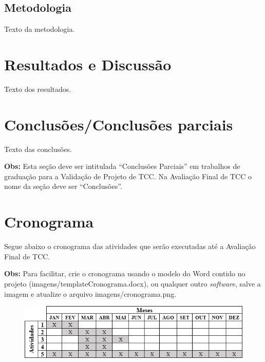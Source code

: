 \documentclass[
	article,			%
	11pt,				%
	oneside,			%
	a4paper,			%
	chapter=TITLE,		%
	section=TITLE,		%
	english,			%
	brazil,				%
	sumario=tradicional
]{abntex2}
\begin{document}
     
     
     
     \subsection{Metodologia}
     
     Texto da metodologia.
     
     
     
     
     

	\section{Resultados e Discussão}
    	
     Texto dos resultados.
     
     
     

	\section{Conclusões/Conclusões parciais}
	
	Texto das conclusões.
	
	\textbf{Obs:} Esta seção deve ser intitulada ``Conclusões Parciais'' em trabalhos de graduação para a Validação de Projeto de TCC. Na Avaliação Final de TCC o nome da seção deve ser ``Conclusões''.
    
    
    

	\section{Cronograma}
	
	Segue abaixo o cronograma das atividades que serão executadas até a Avaliação Final de TCC.
	
	\textbf{Obs:} Para facilitar, crie o cronograma usando o modelo do Word contido no projeto (imagens/templateCronograma.docx), ou qualquer outro \textit{software}, salve a imagem e atualize o arquivo imagens/cronograma.png.
	
	\FloatBarrier
	\begin{figure}[!htbp]
		\centering
		\includegraphics[scale=1]{imagens/cronograma}
	\end{figure}
	\FloatBarrier
	
\end{document}
